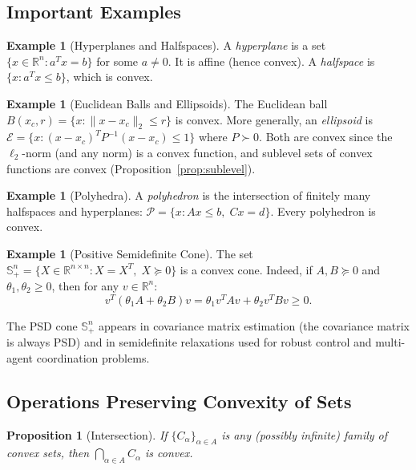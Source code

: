 \documentclass[11pt,a4paper]{article}
\newtheorem{proposition}[theorem]{Proposition}
\theoremstyle{definition}
\newtheorem{example}[theorem]{Example}
\theoremstyle{remark}
\newcommand{\R}{\mathbb{R}}
\begin{document}
\subsection{Important Examples}

\begin{example}[Hyperplanes and Halfspaces]
\label{ex:hyperplane}
A \emph{hyperplane} is a set $\{x \in \R^n : a^T x = b\}$ for some $a \ne 0$. It is
affine (hence convex). A \emph{halfspace} is $\{x : a^T x \le b\}$, which is convex.
\end{example}

\begin{example}[Euclidean Balls and Ellipsoids]
\label{ex:ball-ellipsoid}
The Euclidean ball $B(x_c, r) = \{x : \|x - x_c\|_2 \le r\}$ is convex. More generally,
an \emph{ellipsoid} is $\mathcal{E} = \{x : (x - x_c)^T P^{-1} (x - x_c) \le 1\}$
where $P \succ 0$. Both are convex since the $\ell_2$-norm (and any norm) is a convex
function, and sublevel sets of convex functions are convex (Proposition~\ref{prop:sublevel}).
\end{example}

\begin{example}[Polyhedra]
\label{ex:polyhedra}
A \emph{polyhedron} is the intersection of finitely many halfspaces and hyperplanes:
$\mathcal{P} = \{x : Ax \le b, \; Cx = d\}$. Every polyhedron is convex.
\end{example}

\begin{example}[Positive Semidefinite Cone]
\label{ex:psd-cone}
The set $\mathbb{S}^n_+ = \{X \in \R^{n \times n} : X = X^T, \; X \succeq 0\}$ is a
convex cone. Indeed, if $A, B \succeq 0$ and $\theta_1, \theta_2 \ge 0$, then for any
$v \in \R^n$:
\[
  v^T(\theta_1 A + \theta_2 B)v = \theta_1 v^T A v + \theta_2 v^T B v \ge 0.
\]
\end{example}

\begin{rlconnection}
The PSD cone $\mathbb{S}^n_+$ appears in covariance matrix estimation (the covariance
matrix is always PSD) and in semidefinite relaxations used for robust control and
multi-agent coordination problems.
\end{rlconnection}

\subsection{Operations Preserving Convexity of Sets}

\begin{proposition}[Intersection]
\label{prop:intersection}
If $\{C_\alpha\}_{\alpha \in A}$ is any (possibly infinite) family of convex sets, then
$\bigcap_{\alpha \in A} C_\alpha$ is convex.
\end{proposition}
\end{document}
